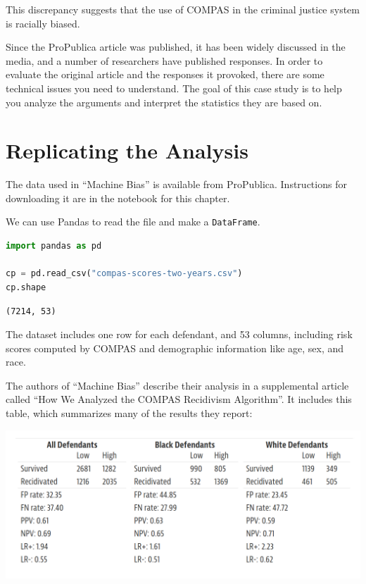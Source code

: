 This discrepancy suggests that the use of COMPAS in the criminal justice
system is racially biased.

Since the ProPublica article was published, it has been widely discussed
in the media, and a number of researchers have published responses. In
order to evaluate the original article and the responses it provoked,
there are some technical issues you need to understand. The goal of this
case study is to help you analyze the arguments and interpret the
statistics they are based on.

\section{Replicating the Analysis}\label{replicating-the-analysis}

The data used in ``Machine Bias'' is available from ProPublica.
Instructions for downloading it are in the notebook for this chapter.

We can use Pandas to read the file and make a
\passthrough{\lstinline!DataFrame!}.

\begin{lstlisting}[language=Python,style=source]
import pandas as pd

cp = pd.read_csv("compas-scores-two-years.csv")
cp.shape
\end{lstlisting}

\begin{lstlisting}[style=output]
(7214, 53)
\end{lstlisting}

The dataset includes one row for each defendant, and 53 columns,
including risk scores computed by COMPAS and demographic information
like age, sex, and race.

The authors of ``Machine Bias'' describe their analysis in a
supplemental article called ``How We Analyzed the COMPAS Recidivism
Algorithm''. It includes this table, which summarizes many of the
results they report:

\includegraphics{chapters/figs/machine_bias_table.png}


